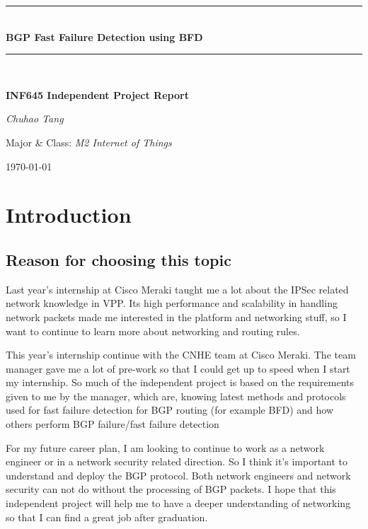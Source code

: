 \documentclass[12pt]{article}
\begin{document}
\begin{titlepage}
    \newcommand{\HRule}{\rule{\linewidth}{0.5mm}}
    \centering
    \vspace*{60px}

    \HRule \\[0.4cm]
    { \huge \bfseries BGP Fast Failure Detection using BFD}
    \HRule \\[0.4cm]

    \vspace*{30px}
    {\Large\bfseries INF645 Independent Project Report\par}
    \vspace{30px}
    {\Large\itshape Chuhao Tang\par}
    \vspace{30px}
    Major \& Class: \textit{M2 Internet of Things}\par
    \vfill
    {\large \today\par}
\end{titlepage}

\tableofcontents
\newpage

\section{Introduction}
\subsection{Reason for choosing this topic}
Last year's internship at Cisco Meraki taught me a lot about the IPSec related network knowledge in VPP. Its high performance and scalability in handling network packets made me
interested in the platform and networking stuff, so I want to continue to learn more about networking and routing rules.

This year's internship continue with the CNHE team at Cisco Meraki. The team manager gave
me a lot of pre-work so that I could get up to speed when I start my internship. So much of the independent project is based on the requirements given to me by the manager, which are, knowing latest methods and protocols used for fast failure detection for BGP routing (for example BFD) and how others perform BGP failure/fast failure detection

For my future career plan, I am looking to continue to work as a network engineer or in a
network security related direction. So I think it's important to understand and deploy the BGP
protocol. Both network engineers and network security can not do without the processing of BGP
packets. I hope that this independent project will help me to have a deeper understanding of
networking so that I can find a great job after graduation.
\end{document}
